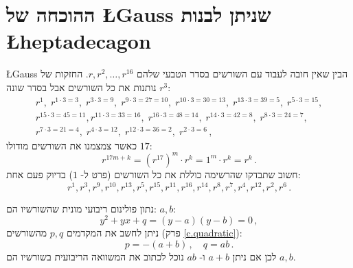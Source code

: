 \section{ההוכחה של 
\L{Gauss}
שניתן לבנות 
\L{heptadecagon}}\label{s.gauss}

\L{Gauss}
הבין שאין חובה לעבוד עם השורשים בסדר הטבעי שלהם
$r,r^2,\ldots,r^{16}$. 
החזקות של
$r^3$
נותנות את כל השורשים אבל בסדר שונה:
\[
\renewcommand{\arraystretch}{1.1}
\begin{array}{l}
r^1, \;r^{1\cdot 3 =3},\; r^{3\cdot 3=9},\; r^{9\cdot 3=27=10},\; r^{10\cdot 3=30=13},\; r^{13\cdot 3=39=5},\; r^{5\cdot 3=15},\\ r^{15\cdot 3=45=11},
r^{11\cdot 3 =33=16}, \;r^{16\cdot 3=48=14},\; r^{14\cdot 3=42=8},\; r^{8\cdot 3=24=7},\\r^{7\cdot 3=21=4},\; r^{4\cdot 3=12},\; r^{12\cdot 3=36=2},\; r^{2\cdot 3=6}\,,
\end{array}
\]
כאשר צמצמנו את השורשים מודולו
$17$:
\[
r^{17m+k}=(r^{17})^m\cdot r^k=1^m\cdot r^k=r^k\,.
\]
חשוב שתבדקו שהרשימה כוללת את כל השורשים  (פרט ל-%
$1$)
בדיוק פעם אחת:
\begin{equation}\label{eq.roots}
r^1, r^3, r^9, r^{10}, r^{13}, r^5, r^{15}, r^{11}, r^{16}, r^{14}, r^8, r^7, r^4, r^{12}, r^2, r^6\,.
\end{equation}

נתון פולינום ריבועי מונית שהשורשיו הם:
$a,b$:
\[
y^2+yx+q=(y-a)(y-b)=0\,,
\]
ניתן לחשב את המקדמים
$p,	q$
מהשורשים
(פרק%
\ref{c.quadratic}):
\[
p=-(a+b)\,,\quad q=ab\,.
\]
לכן אם ניתן 
$a+b$
ו-%
$ab$
נוכל לכתוב את המשוואה הריבועית בשורשיו הם
$a,b$.

